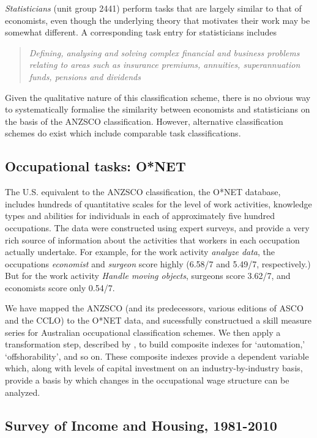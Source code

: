 {\em Statisticians} (unit group 2441) perform tasks that are largely similar to that of economists, even though the underlying theory that motivates their work may be somewhat different. A corresponding task entry for statisticians includes
\begin{quote}
{\em Defining, analysing and solving complex financial and business problems relating to areas such as insurance premiums, annuities, superannuation funds, pensions and dividends \citep[p.181]{Trewin2006}}
\end{quote}
Given the qualitative nature of this classification scheme, there is no obvious way to systematically formalise the similarity between economists and statisticians on the basis of the ANZSCO classification. However, alternative classification schemes do exist which include comparable task classifications.

\subsection{Occupational tasks: O*NET}

The U.S. equivalent to the ANZSCO classification, the O*NET database, includes hundreds of quantitative scales for the level of work activities, knowledge types and abilities for individuals in each of approximately five hundred occupations. The data were constructed using expert surveys, and provide a very rich source of information about the activities that workers in each occupation actually undertake. For example, for the work activity {\em analyze data}, the occupations {\em economist} and {\em surgeon} score highly (6.58/7 and 5.49/7, respectively.) But for the work activity {\em Handle moving objects}, surgeons score 3.62/7, and economists score only 0.54/7.

We have mapped the ANZSCO (and its predecessors, various editions of ASCO and the CCLO) to the O*NET data, and sucessfully constructued a skill measure series for Australian occupational classification schemes. We then apply a transformation step, described by \citet{Firpo2011}, to build composite indexes for `automation,' `offshorability', and so on. These composite indexes provide a dependent variable which, along with levels of capital investment on an industry-by-industry basis, provide a basis by which changes in the occupational wage structure can be analyzed.

\subsection{Survey of Income and Housing, 1981-2010}

